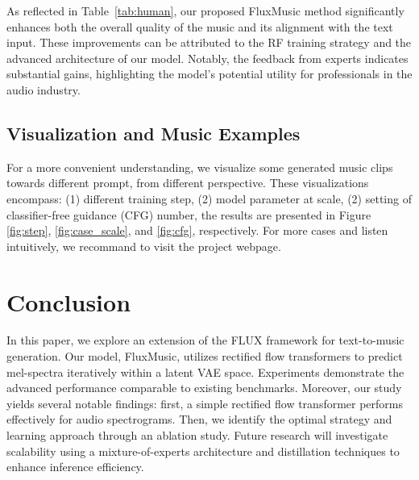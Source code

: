 As reflected in Table~\ref{tab:human}, our proposed FluxMusic method significantly enhances both the overall quality of the music and its alignment with the text input. These improvements can be attributed to the RF training strategy and the advanced architecture of our model. Notably, the feedback from experts indicates substantial gains, highlighting the model's potential utility for professionals in the audio industry.

\subsection{Visualization and Music Examples}

For a more convenient understanding, we visualize some generated music clips towards different prompt, from different perspective. These visualizations encompass: (1) different training step, (2) model parameter at scale, (2) setting of classifier-free guidance (CFG) number, the results are presented in Figure \ref{fig:step}, \ref{fig:case_scale}, and \ref{fig:cfg}, respectively. For more cases and listen intuitively, we recommand to visit the project webpage. 

\section{Conclusion}

In this paper, we explore an extension of the FLUX framework for text-to-music generation. Our model, FluxMusic, utilizes rectified flow transformers to predict mel-spectra iteratively within a latent VAE space. Experiments demonstrate the advanced performance comparable to existing benchmarks. Moreover, our study yields several notable findings: first, a simple rectified flow transformer performs effectively for audio spectrograms. Then, we identify the optimal strategy and learning approach through an ablation study. Future research will investigate scalability using a mixture-of-experts architecture and distillation techniques to enhance inference efficiency.

